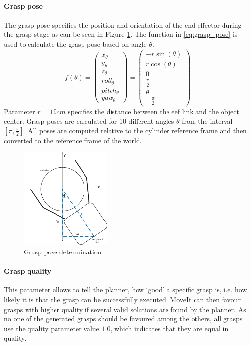 \paragraph{Grasp pose} The grasp pose specifies the position and orientation of the end effector during the grasp stage as can be seen in Figure \ref{fig:grasp_pose}. The function in \ref{eq:grasp_pose} is used to calculate the grasp pose based on angle $\theta$. 
\begin{equation} \label{eq:grasp_pose}
f(\theta) = 
\begin{pmatrix}
x_{\theta} \\
y_{\theta} \\
z_{\theta} \\ 
roll_{\theta} \\
pitch_{\theta} \\
yaw_{\theta}
\end{pmatrix} =
\begin{pmatrix}
-r\sin(\theta) \\
r\cos(\theta) \\
0 \\ 
\frac{\pi}{2} \\
\theta \\
-\frac{\pi}{2}
\end{pmatrix}
\end{equation}
Parameter $r=19cm$ specifies the distance between the eef link and the object center. Grasp poses are calculated for 10 different angles $\theta$ from the interval $[\pi, \frac{\pi}{2}]$. All poses are computed relative to the cylinder reference frame and then converted to the reference frame of the world.

\begin{figure}[ht]
	\centering
  	\includegraphics[width=0.4\textwidth]{images/grasps.jpg}
	\caption{Grasp pose determination}
	\label{fig:grasp_pose}
\end{figure}

\paragraph{Grasp quality} This parameter allows to tell the planner, how `good' a specific grasp is, i.e. how likely it is that the grasp can be successfully executed. MoveIt can then favour grasps with higher quality if several valid solutions are found by the planner. As no one of the generated grasps should be favoured among the others, all grasps use the quality parameter value $1.0$, which indicates that they are equal in quality.

